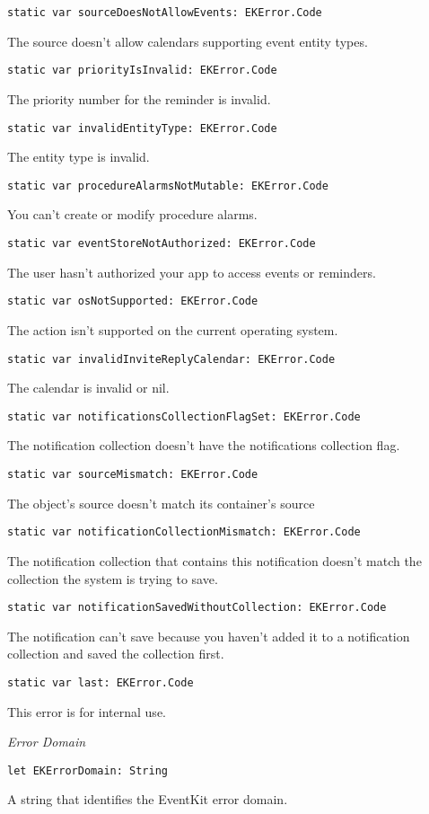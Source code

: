\documentclass{article}
\begin{document}
\texttt{static var sourceDoesNotAllowEvents: EKError.Code}

The source doesn't allow calendars supporting event entity types.

\texttt{static var priorityIsInvalid: EKError.Code}

The priority number for the reminder is invalid.

\texttt{static var invalidEntityType: EKError.Code}

The entity type is invalid.

\texttt{static var procedureAlarmsNotMutable: EKError.Code}

You can't create or modify procedure alarms.

\texttt{static var eventStoreNotAuthorized: EKError.Code}

The user hasn't authorized your app to access events or reminders.

\texttt{static var osNotSupported: EKError.Code}

The action isn't supported on the current operating system.

\texttt{static var invalidInviteReplyCalendar: EKError.Code}

The calendar is invalid or nil.

\texttt{static var notificationsCollectionFlagSet: EKError.Code}

The notification collection doesn't have the notifications collection flag.

\texttt{static var sourceMismatch: EKError.Code}

The object's source doesn't match its container's source

\texttt{static var notificationCollectionMismatch: EKError.Code}

The notification collection that contains this notification doesn't match the collection the system is trying to save.

\texttt{static var notificationSavedWithoutCollection: EKError.Code}

The notification can't save because you haven't added it to a notification collection and saved the collection first.

\texttt{static var last: EKError.Code}

This error is for internal use.

\textit{Error Domain}

\texttt{let EKErrorDomain: String}

A string that identifies the EventKit error domain.
\end{document}
